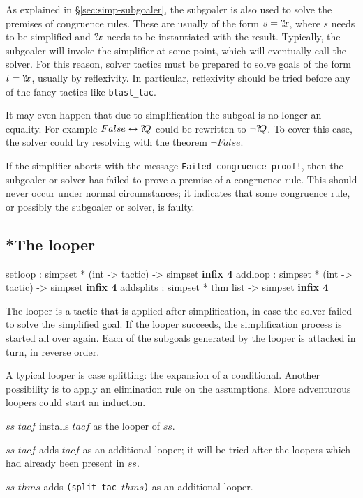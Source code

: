 \medskip

As explained in \S\ref{sec:simp-subgoaler}, the subgoaler is also used
to solve the premises of congruence rules.  These are usually of the
form $s = {?\!x}$, where $s$ needs to be simplified and ${?\!x}$
needs to be instantiated with the result.  Typically, the subgoaler
will invoke the simplifier at some point, which will eventually call
the solver.  For this reason, solver tactics must be prepared to solve
goals of the form $t = {?\!x}$, usually by reflexivity.  In
particular, reflexivity should be tried before any of the fancy
tactics like \texttt{blast_tac}.

It may even happen that due to simplification the subgoal is no longer
an equality.  For example $False \leftrightarrow {?\!Q}$ could be rewritten to
$\neg{?\!Q}$.  To cover this case, the solver could try resolving
with the theorem $\neg False$.

\medskip

\begin{warn}
  If the simplifier aborts with the message \texttt{Failed congruence
    proof!}, then the subgoaler or solver has failed to prove a
  premise of a congruence rule.  This should never occur under normal
  circumstances; it indicates that some congruence rule, or possibly
  the subgoaler or solver, is faulty.
\end{warn}


\subsection{*The looper}\label{sec:simp-looper}
\begin{ttbox}
setloop   : simpset * (int -> tactic) -> simpset \hfill{\bf infix 4}
addloop   : simpset * (int -> tactic) -> simpset \hfill{\bf infix 4}
addsplits : simpset * thm list -> simpset \hfill{\bf infix 4}
\end{ttbox}

The looper is a tactic that is applied after simplification, in case
the solver failed to solve the simplified goal.  If the looper
succeeds, the simplification process is started all over again.  Each
of the subgoals generated by the looper is attacked in turn, in
reverse order.

A typical looper is case splitting: the expansion of a conditional.
Another possibility is to apply an elimination rule on the
assumptions.  More adventurous loopers could start an induction.

\begin{ttdescription}
  
\item[$ss$ \ttindexbold{setloop} $tacf$] installs $tacf$ as the looper
  of $ss$.
  
\item[$ss$ \ttindexbold{addloop} $tacf$] adds $tacf$ as an additional
  looper; it will be tried after the loopers which had already been
  present in $ss$.
  
\item[$ss$ \ttindexbold{addsplits} $thms$] adds
  \texttt{(split_tac~$thms$)} as an additional looper.

\end{ttdescription}



